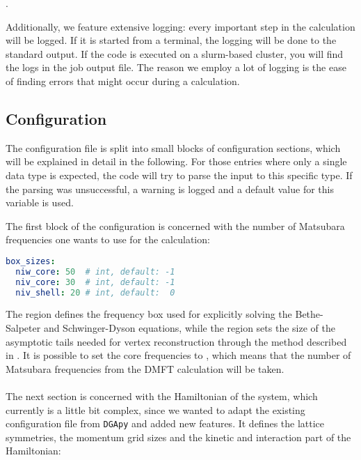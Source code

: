 \documentclass[../../main.tex]{subfiles}
\begin{document}
\mbox{}.

Additionally, we feature extensive logging: every important step in the calculation will be logged. If it is started from a terminal, the logging will be done to the standard output. If the code is executed on a slurm-based cluster, you will find the logs in the job output file. The reason we employ a lot of logging is the ease of finding errors that might occur during a calculation.

\subsection{Configuration}

The configuration file is split into small blocks of configuration sections, which will be explained in detail in the following. For those entries where only a single data type is expected, the code will try to parse the input to this specific type. If the parsing was unsuccessful, a warning is logged and a default value for this variable is used. 

The first block of the configuration is concerned with the number of Matsubara frequencies one wants to use for the calculation:

\begin{minipage}{\textwidth}%
\begin{lstlisting}[language=yaml]
box_sizes:
  niw_core: 50  # int, default: -1
  niv_core: 30  # int, default: -1
  niv_shell: 20 # int, default:  0
\end{lstlisting}
\end{minipage}
The  region defines the frequency box used for explicitly solving the Bethe-Salpeter and Schwinger-Dyson equations, while the  region sets the size of the asymptotic tails needed for vertex reconstruction through the method described in . It is possible to set the core frequencies to , which means that the number of Matsubara frequencies from the DMFT calculation will be taken.
\\\\
The next section is concerned with the Hamiltonian of the system, which currently is a little bit complex, since we wanted to adapt the existing configuration file from \texttt{DGApy} and added new features. It defines the lattice symmetries, the momentum grid sizes and the kinetic and interaction part of the Hamiltonian:
\end{document}
